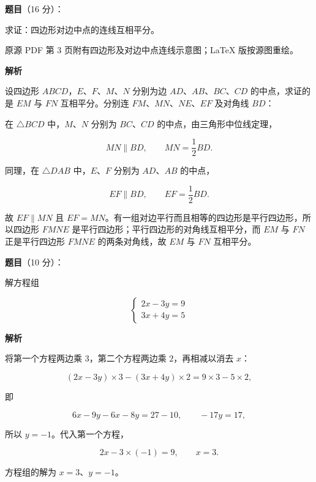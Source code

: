 \begin{answer}

\textbf{题目}（16 分）：

求证：四边形对边中点的连线互相平分。

\begin{gktip}
原源 PDF 第 3 页附有四边形及对边中点连线示意图；LaTeX 版按源图重绘。
\end{gktip}
\nopagebreak[4]
\begin{center}\end{center}
\nopagebreak[4]
\textbf{解析}

设四边形 $ABCD$，$E$、$F$、$M$、$N$ 分别为边 $AD$、$AB$、$BC$、$CD$ 的中点，求证的是 $EM$ 与 $FN$ 互相平分。分别连 $FM$、$MN$、$NE$、$EF$ 及对角线 $BD$：
\nopagebreak[4]
\begin{center}\end{center}
\nopagebreak[4]
在 $\triangle BCD$ 中，$M$、$N$ 分别为 $BC$、$CD$ 的中点，由三角形中位线定理，

\nopagebreak[4]
\[
MN\parallel BD,
\qquad
MN=\frac12BD.
\]

同理，在 $\triangle DAB$ 中，$E$、$F$ 分别为 $AD$、$AB$ 的中点，

\nopagebreak[4]
\[
EF\parallel BD,
\qquad
EF=\frac12BD.
\]

故 $EF\parallel MN$ 且 $EF=MN$。有一组对边平行而且相等的四边形是平行四边形，所以四边形 $FMNE$ 是平行四边形；平行四边形的对角线互相平分，而 $EM$ 与 $FN$ 正是平行四边形 $FMNE$ 的两条对角线，故 $EM$ 与 $FN$ 互相平分。


\end{answer}
\begin{answer}

\textbf{题目}（10 分）：

解方程组

\nopagebreak[4]
\[
\begin{cases}
2x-3y=9\\
3x+4y=5
\end{cases}
\]

\textbf{解析}

将第一个方程两边乘 $3$，第二个方程两边乘 $2$，再相减以消去 $x$：

\nopagebreak[4]
\[
(2x-3y)\times3-(3x+4y)\times2=9\times3-5\times2,
\]

即

\nopagebreak[4]
\[
6x-9y-6x-8y=27-10,
\qquad
-17y=17,
\]

所以 $y=-1$。代入第一个方程，

\nopagebreak[4]
\[
2x-3\times(-1)=9,
\qquad
x=3.
\]

方程组的解为 $x=3$、$y=-1$。


\end{answer}
